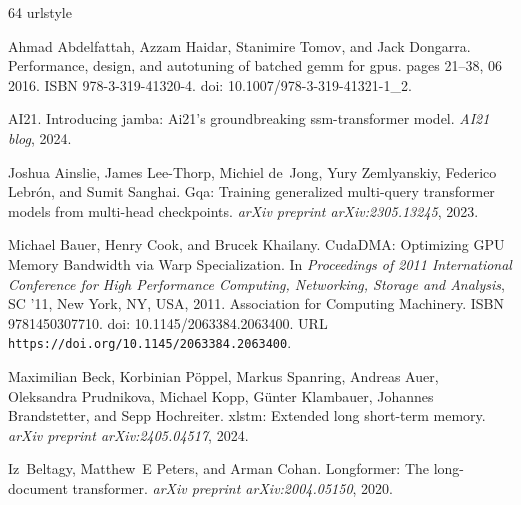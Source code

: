 \documentclass{article}
\begin{document}
\begin{thebibliography}{64}
\providecommand{\natexlab}[1]{#1}
\providecommand{\url}[1]{\texttt{#1}}
\expandafter\ifx\csname urlstyle\endcsname\relax
  \providecommand{\doi}[1]{doi: #1}\else
  \providecommand{\doi}{doi: \begingroup \urlstyle{rm}\Url}\fi

Ahmad Abdelfattah, Azzam Haidar, Stanimire Tomov, and Jack Dongarra.
\newblock Performance, design, and autotuning of batched gemm for gpus.
\newblock pages 21--38, 06 2016.
\newblock ISBN 978-3-319-41320-4.
\newblock \doi{10.1007/978-3-319-41321-1_2}.

AI21.
\newblock Introducing jamba: Ai21's groundbreaking ssm-transformer model.
\newblock \emph{AI21 blog}, 2024.

Joshua Ainslie, James Lee-Thorp, Michiel de~Jong, Yury Zemlyanskiy, Federico
  Lebr{\'o}n, and Sumit Sanghai.
\newblock Gqa: Training generalized multi-query transformer models from
  multi-head checkpoints.
\newblock \emph{arXiv preprint arXiv:2305.13245}, 2023.

Michael Bauer, Henry Cook, and Brucek Khailany.
\newblock Cuda{DMA}: {O}ptimizing {GPU} {M}emory {B}andwidth via {W}arp
  {S}pecialization.
\newblock In \emph{Proceedings of 2011 International Conference for High
  Performance Computing, Networking, Storage and Analysis}, SC '11, New York,
  NY, USA, 2011. Association for Computing Machinery.
\newblock ISBN 9781450307710.
\newblock \doi{10.1145/2063384.2063400}.
\newblock URL \url{https://doi.org/10.1145/2063384.2063400}.

Maximilian Beck, Korbinian P{\"o}ppel, Markus Spanring, Andreas Auer,
  Oleksandra Prudnikova, Michael Kopp, G{\"u}nter Klambauer, Johannes
  Brandstetter, and Sepp Hochreiter.
\newblock xlstm: Extended long short-term memory.
\newblock \emph{arXiv preprint arXiv:2405.04517}, 2024.

Iz~Beltagy, Matthew~E Peters, and Arman Cohan.
\newblock Longformer: The long-document transformer.
\newblock \emph{arXiv preprint arXiv:2004.05150}, 2020.


\end{thebibliography}
\end{document}
